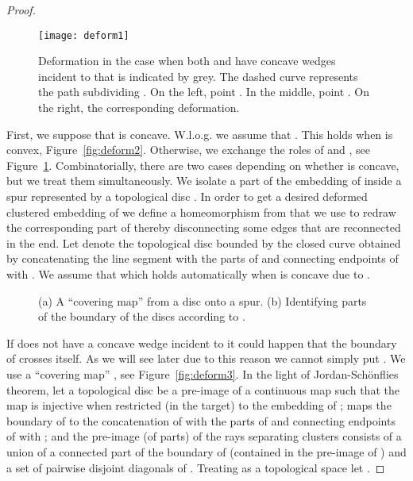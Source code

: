 \documentclass{llncs}
\begin{document}
\begin{proof}
 \begin{figure}[h]
  \centering
\centering
{
\texttt{[image: deform1]}
    	}

\caption{Deformation in the case when both  and  have concave wedges incident to  that is indicated by grey.
The dashed curve represents the path  subdividing .
On the left,  point . In the middle, 
   point . On the right, the corresponding
 deformation.}
\label{fig:deform1}
\end{figure}


 First, we suppose that  is concave.
 W.l.o.g. we assume that . This holds when  is convex,
 Figure~\ref{fig:deform2}. Otherwise,
we exchange the roles of  and , see Figure~\ref{fig:deform1}. Combinatorially, there are two
cases depending on whether  is concave, but we treat them
simultaneously.
We isolate a part of the embedding of  inside a spur represented
by a topological disc . In order to get a desired deformed clustered embedding of  we define a homeomorphism from  that we use to redraw the corresponding part of   thereby disconnecting some edges
that are reconnected in the end.
 Let  denote the topological disc bounded by the closed curve
obtained by concatenating the line segment  with the parts
of  and  connecting endpoints of   with . 
We assume that  which holds automatically when  is concave due to . 

 
 

 \begin{figure}[h]
  \centering
\centering
{}
    	\hspace{10px}
\caption{(a) A ``covering map''  from a disc onto a spur. (b) Identifying parts of the boundary of the discs  
according to .}

\end{figure}
 

  If  does not have a concave wedge incident to  it could happen that the boundary of  crosses itself. As we will see later due to this reason we cannot simply put .
We use a ``covering map'' , see Figure~\ref{fig:deform3}.
In the light of Jordan-Sch\"onflies theorem,
  let a topological disc  be a pre-image of a continuous  map   such that the map  is injective when restricted (in the target) to the embedding of ;
 maps the boundary of  to the concatenation of 
with the parts of  and  connecting endpoints of   with ;
and the pre-image (of  parts) of the rays separating clusters
 consists of a union of a connected part of the boundary of  
 (contained in the pre-image of ) and
a set of pairwise disjoint diagonals of .
Treating  as a topological space let .  


\end{proof}
\end{document}
